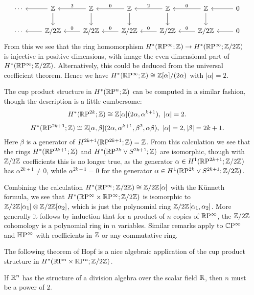 \[\begin{tikzcd}
\cdots&\Z\ar[l]\ar[d]&\Z\ar[l,swap,"2"]\ar[d]&\Z\ar[l,swap,"0"]\ar[d]&\Z\ar[l,swap,"2"]\ar[d]&\Z\ar[l,swap,"0"]\ar[d]&0\ar[l]\\
\cdots&\Z/2\Z\ar[l]&\Z/2\Z\ar[l,swap,"0"]&\Z/2\Z\ar[l,swap,"0"]&\Z/2\Z\ar[l,swap,"0"]&\Z/2\Z\ar[l,swap,"0"]&0\ar[l]
\end{tikzcd}\]
From this we see that the ring homomorphism $H^*(\mathbb{R}\mathrm{P}^\infty;\mathbb{Z})\to H^*(\mathbb{R}\mathrm{P}^\infty;\mathbb{Z}/2\mathbb{Z})$ is injective in positive dimensions, with image the even-dimensional part of $H^*(\mathbb{R}\mathrm{P}^\infty;\mathbb{Z}/2\mathbb{Z})$. Alternatively, this could be deduced from the universal coefficient theorem. Hence we have $H^*(\mathbb{R}\mathrm{P}^\infty;\mathbb{Z})\cong\mathbb{Z}[\alpha]/(2\alpha)$ with $|\alpha|=2$.\par
The cup product structure in $H^*(\mathbb{R}\mathrm{P}^n;\mathbb{Z})$ can be computed in a similar fashion, though the description is a little cumbersome:
\[H^*(\RP^{2k};\Z)\cong\Z[\alpha](2\alpha,\alpha^{k+1}),\ |\alpha|=2.\]
\[H^*(\RP^{2k+1};\Z)\cong\Z[\alpha,\beta](2\alpha,\alpha^{k+1},\beta^2,\alpha\beta),\ |\alpha|=2,|\beta|=2k+1.\]
Here $\beta$ is a generator of $H^{2k+1}(\mathbb{R}\mathrm{P}^{2k+1};\mathbb{Z})=\mathbb{Z}$. From this calculation we see that the rings $H^*(\mathbb{R}\mathrm{P}^{2k+1};\mathbb{Z})$ and $H^*(\mathbb{R}\mathrm{P}^{2k}\vee S^{2k+1};\mathbb{Z})$ are isomorphic, though with $\mathbb{Z}/2\mathbb{Z}$ coefficients this is no longer true, as the generator $\alpha\in H^1(\mathbb{R}\mathrm{P}^{2k+1};\mathbb{Z}/2\mathbb{Z})$ has $\alpha^{2k+1}\neq0$, while $\alpha^{2k+1}=0$ for the generator $\alpha\in H^1(\mathbb{R}\mathrm{P}^{2k}\vee S^{2k+1};\mathbb{Z}/2\mathbb{Z})$.
\begin{example}
Combining the calculation $H^*(\mathbb{R}\mathrm{P}^\infty;\mathbb{Z}/2\mathbb{Z})\cong\mathbb{Z}/2\mathbb{Z}[\alpha]$ with the K\"unneth formula, we see that $H^*(\mathbb{R}\mathrm{P}^\infty\times\mathbb{R}\mathrm{P}^\infty;\mathbb{Z}/2\mathbb{Z})$ is isomorphic to $\mathbb{Z}/2\mathbb{Z}[\alpha_1]\otimes\mathbb{Z}/2\mathbb{Z}[\alpha_2]$, which is just the polynomial ring $\mathbb{Z}/2\mathbb{Z}[\alpha_1,\alpha_2]$. More generally it follows by induction that for a product of $n$ copies of $\mathbb{R}\mathrm{P}^\infty$, the $\mathbb{Z}/2\mathbb{Z}$ cohomology is a polynomial ring in $n$ variables. Similar remarks apply to $\mathbb{C}\mathrm{P}^\infty$ and $\mathbb{H}\mathrm{P}^\infty$ with coefficients in $\mathbb{Z}$ or any commutative ring.
\end{example}
The following theorem of Hopf is a nice algebraic application of the cup product structure in $H^*(\mathbb{R}\mathrm{P}^n\times\mathbb{R}\mathrm{P}^n;\mathbb{Z}/2\mathbb{Z})$.
\begin{theorem}
If $\mathbb{R}^n$ has the structure of a division algebra over the scalar field $\mathbb{R}$,
then $n$ must be a power of $2$.
\end{theorem}
